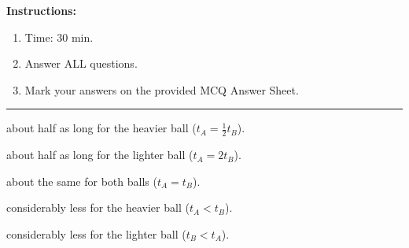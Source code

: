 

    \maketitle

    \eline[-2]
    \textbf{Instructions:}
    \begin{enumerate}
        \item Time: 30 min.
        \item Answer ALL questions.
        \item Mark your answers on the provided MCQ Answer Sheet.
    \end{enumerate}
    \begin{center}\rule{0.7\textwidth}{0.5pt}\end{center}


         \begin{options}
            \item about half as long for the heavier ball ($\displaystyle t_A = \frac{1}{2} t_B$).
            \item about half as long for the lighter ball ($t_A = 2 t_B$).
            \item about the same for both balls ($t_A = t_B$).
            \item considerably less for the heavier ball ($t_A < t_B$).
            \item considerably less for the lighter ball ($t_B < t_A$).
         \end{options}

